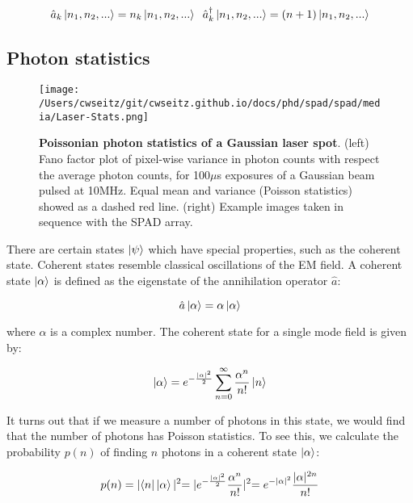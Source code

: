 \begin{equation*}
\hat{a}_k \ket{n_1, n_2, ...} = n_k \ket{n_1, n_2, ...} \;\;
\hat{a}_k^\dagger \ket{n_1, n_2, ...} = (n+1) \ket{n_1, n_2, ...}
\end{equation*}

\subsection{Photon statistics}

\begin{figure*}[t]
\centering
\texttt{[image: /Users/cwseitz/git/cwseitz.github.io/docs/phd/spad/spad/media/Laser-Stats.png]}
\caption{\textbf{Poissonian photon statistics of a Gaussian laser spot}. (left) Fano factor plot of pixel-wise variance in photon counts with respect the average photon counts, for 100$\mu$s exposures of a Gaussian beam pulsed at 10MHz. Equal mean and variance (Poisson statistics) showed as a dashed red line. (right) Example images taken in sequence with the SPAD array.}
\label{fig:fig29}
\end{figure*}    

There are certain states $\ket{\psi}$ which have special properties, such as the coherent state. Coherent states resemble classical oscillations of the EM field. A coherent state $\ket{\alpha}$ is defined as the eigenstate of the annihilation operator $\hat{a}$:

\begin{equation*}
\hat{a} \ket{\alpha} = \alpha \ket{\alpha}
\end{equation*}

where $\alpha$ is a complex number. The coherent state for a single mode field is given by:

\begin{equation*}
\ket{\alpha} = e^{-\frac{\lvert\alpha\lvert^2}{2}} \sum_{n=0}^\infty \frac{\alpha^n}{n!} \ket{n}
\end{equation*}

It turns out that if we measure a number of photons in this state, we would find that the number of photons has Poisson statistics. To see this, we calculate the probability $p(n)$ of finding $n$ photons in a coherent state $\ket{\alpha}$:

\begin{equation*}
p(n) = \lvert \bra{n} \ket{\alpha} \lvert^2 = \lvert e^{-\frac{\lvert\alpha\lvert^2}{2}} \frac{\alpha^n}{n!} \lvert^2 = e^{-\lvert\alpha\lvert^2} \frac{\lvert\alpha\lvert^{2n}}{n!}
\end{equation*}

